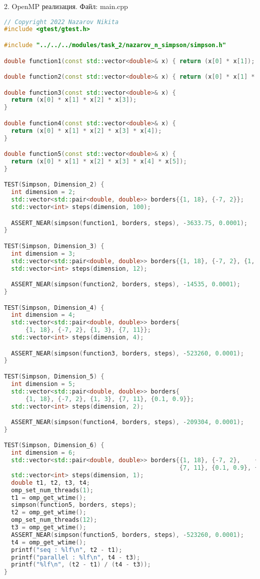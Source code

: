 \documentclass{report}
\begin{document}
\par 2. OpenMP реализация. Файл: main.cpp

\begin{lstlisting}[language=C++]
// Copyright 2022 Nazarov Nikita
#include <gtest/gtest.h>

#include "../../../modules/task_2/nazarov_n_simpson/simpson.h"

double function1(const std::vector<double>& x) { return (x[0] * x[1]); }

double function2(const std::vector<double>& x) { return (x[0] * x[1] * x[2]); }

double function3(const std::vector<double>& x) {
  return (x[0] * x[1] * x[2] * x[3]);
}

double function4(const std::vector<double>& x) {
  return (x[0] * x[1] * x[2] * x[3] * x[4]);
}

double function5(const std::vector<double>& x) {
  return (x[0] * x[1] * x[2] * x[3] * x[4] * x[5]);
}

TEST(Simpson, Dimension_2) {
  int dimension = 2;
  std::vector<std::pair<double, double>> borders{{1, 18}, {-7, 2}};
  std::vector<int> steps(dimension, 100);

  ASSERT_NEAR(simpson(function1, borders, steps), -3633.75, 0.0001);
}

TEST(Simpson, Dimension_3) {
  int dimension = 3;
  std::vector<std::pair<double, double>> borders{{1, 18}, {-7, 2}, {1, 3}};
  std::vector<int> steps(dimension, 12);

  ASSERT_NEAR(simpson(function2, borders, steps), -14535, 0.0001);
}

TEST(Simpson, Dimension_4) {
  int dimension = 4;
  std::vector<std::pair<double, double>> borders{
      {1, 18}, {-7, 2}, {1, 3}, {7, 11}};
  std::vector<int> steps(dimension, 4);

  ASSERT_NEAR(simpson(function3, borders, steps), -523260, 0.0001);
}

TEST(Simpson, Dimension_5) {
  int dimension = 5;
  std::vector<std::pair<double, double>> borders{
      {1, 18}, {-7, 2}, {1, 3}, {7, 11}, {0.1, 0.9}};
  std::vector<int> steps(dimension, 2);

  ASSERT_NEAR(simpson(function4, borders, steps), -209304, 0.0001);
}

TEST(Simpson, Dimension_6) {
  int dimension = 6;
  std::vector<std::pair<double, double>> borders{{1, 18}, {-7, 2},    {1, 3},
                                                 {7, 11}, {0.1, 0.9}, {2, 3}};
  std::vector<int> steps(dimension, 1);
  double t1, t2, t3, t4;
  omp_set_num_threads(1);
  t1 = omp_get_wtime();
  simpson(function5, borders, steps);
  t2 = omp_get_wtime();
  omp_set_num_threads(12);
  t3 = omp_get_wtime();
  ASSERT_NEAR(simpson(function5, borders, steps), -523260, 0.0001);
  t4 = omp_get_wtime();
  printf("seq : %lf\n", t2 - t1);
  printf("parallel : %lf\n", t4 - t3);
  printf("%lf\n", (t2 - t1) / (t4 - t3));
}
\end{lstlisting}
\end{document}

